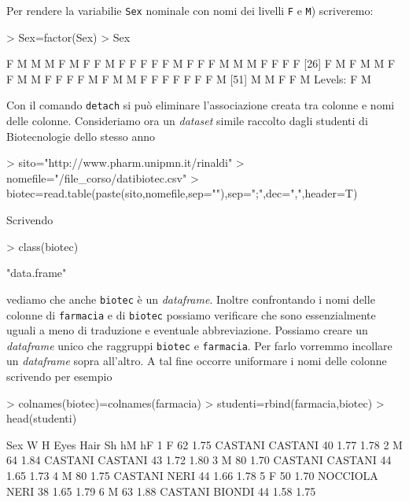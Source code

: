 \documentclass[onecolumn,11pt]{book}
\begin{document}
Per rendere la variabilie \texttt{Sex} nominale con nomi dei livelli 
\texttt{F} e \texttt{M})  scriveremo:
\begin{Schunk}
\begin{Sinput}
> Sex=factor(Sex)
> Sex
\end{Sinput}
\begin{Soutput}
 [1] F M M M F M F F M F F F F F M F F F M M M F F F F
[26] F M F M M F F M M F F F F M F M M F F F F F F F M
[51] M M F F M
Levels: F M
\end{Soutput}
\end{Schunk}
Con il comando 
\texttt{detach}   si pu\`o eliminare l'associazione creata tra colonne e nomi delle colonne.
Consideriamo ora un \emph{dataset} simile raccolto dagli studenti di Biotecnologie dello stesso anno
\begin{Schunk}
\begin{Sinput}
> sito="http://www.pharm.unipmn.it/rinaldi"
> nomefile="/file_corso/datibiotec.csv"
> biotec=read.table(paste(sito,nomefile,sep=""),sep=";",dec=",",header=T)
\end{Sinput}
\end{Schunk}
Scrivendo
\begin{Schunk}
\begin{Sinput}
> class(biotec)
\end{Sinput}
\begin{Soutput}
[1] "data.frame"
\end{Soutput}
\end{Schunk}
vediamo che anche \texttt{biotec} \`e un \emph{dataframe}.  Inoltre confrontando i nomi delle colonne di \texttt{farmacia} e di \texttt{biotec} possiamo verificare che sono essenzialmente uguali a meno di traduzione e eventuale abbreviazione.
Possiamo creare un \emph{dataframe} unico che raggruppi \texttt{biotec} e \texttt{farmacia}. Per farlo  vorremmo incollare un \emph{dataframe} sopra all'altro. 
A tal fine occorre uniformare i nomi delle colonne scrivendo per esempio
\begin{Schunk}
\begin{Sinput}
> colnames(biotec)=colnames(farmacia)
> studenti=rbind(farmacia,biotec)
> head(studenti)
\end{Sinput}
\begin{Soutput}
  Sex  W    H     Eyes    Hair Sh   hM   hF
1   F 62 1.75  CASTANI CASTANI 40 1.77 1.78
2   M 64 1.84  CASTANI CASTANI 43 1.72 1.80
3   M 80 1.70  CASTANI CASTANI 44 1.65 1.73
4   M 80 1.75  CASTANI    NERI 44 1.66 1.78
5   F 50 1.70 NOCCIOLA    NERI 38 1.65 1.79
6   M 63 1.88  CASTANI  BIONDI 44 1.58 1.75
\end{Soutput}
\end{Schunk}
\end{document}
